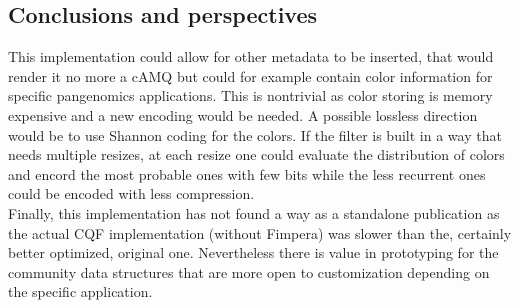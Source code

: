 \subsection{Conclusions and perspectives}
This implementation could allow for other metadata to be inserted, that would render it no more a cAMQ but could for example contain color information for specific pangenomics applications. This is nontrivial as color storing is memory expensive and a new encoding would be needed. A possible lossless direction would be to use Shannon coding for the colors. If the filter is built in a way that needs multiple resizes, at each resize one could evaluate the distribution of colors and encord the most probable ones with few bits while the less recurrent ones could be encoded with less compression. \\
Finally, this implementation has not found a way as a standalone publication as the actual CQF implementation (without Fimpera) was slower than the, certainly better optimized, original one.
Nevertheless there is value in prototyping for the community data structures that are more open to customization depending on the specific application.

